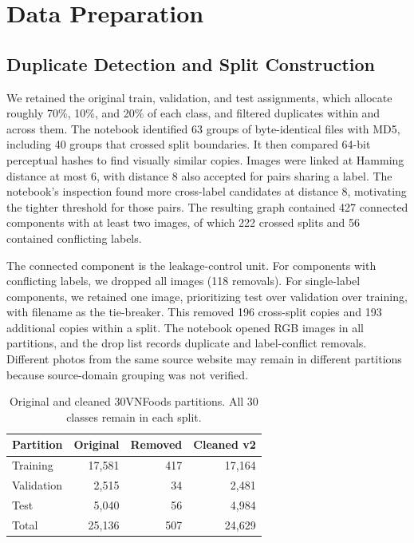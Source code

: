 \clearpage
\section{Data Preparation}
\label{sec:data-preparation}

\subsection{Duplicate Detection and Split Construction}

We retained the original train, validation, and test assignments, which allocate roughly 70\%, 10\%, and 20\% of each class, and filtered duplicates within and across them. The notebook identified 63 groups of byte-identical files with MD5, including 40 groups that crossed split boundaries. It then compared 64-bit perceptual hashes to find visually similar copies. Images were linked at Hamming distance at most 6, with distance 8 also accepted for pairs sharing a label. The notebook's inspection found more cross-label candidates at distance 8, motivating the tighter threshold for those pairs. The resulting graph contained 427 connected components with at least two images, of which 222 crossed splits and 56 contained conflicting labels.

The connected component is the leakage-control unit. For components with conflicting labels, we dropped all images (118 removals). For single-label components, we retained one image, prioritizing test over validation over training, with filename as the tie-breaker. This removed 196 cross-split copies and 193 additional copies within a split. The notebook opened RGB images in all partitions, and the drop list records duplicate and label-conflict removals. Different photos from the same source website may remain in different partitions because source-domain grouping was not verified.

\begin{table}[htbp]
    \centering
    \caption{Original and cleaned 30VNFoods partitions. All 30 classes remain in each split.}
    \label{tab:a2-data-splits}
    \begin{tabular}{lrrr}
        \toprule
        Partition & Original & Removed & Cleaned v2 \\
        \midrule
        Training & 17,581 & 417 & 17,164 \\
        Validation & 2,515 & 34 & 2,481 \\
        Test & 5,040 & 56 & 4,984 \\
        \midrule
        Total & 25,136 & 507 & 24,629 \\
        \bottomrule
    \end{tabular}
\end{table}

